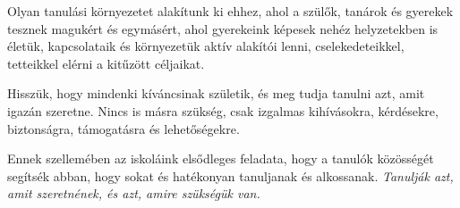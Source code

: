 Olyan tanulási környezetet alakítunk ki ehhez, ahol a szülők, tanárok és gyerekek tesznek magukért és egymásért, ahol gyerekeink képesek nehéz helyzetekben is életük, kapcsolataik és környezetük aktív alakítói lenni, cselekedeteikkel, tetteikkel elérni a kitűzött céljaikat.

Hisszük, hogy mindenki kíváncsinak születik, és meg tudja tanulni azt, amit igazán szeretne. Nincs is másra szükség, csak izgalmas kihívásokra, kérdésekre, biztonságra, támogatásra és lehetőségekre.

Ennek szellemében az iskoláink elsődleges feladata, hogy a tanulók közösségét segítsék abban, hogy sokat és hatékonyan tanuljanak és alkossanak. \emph{Tanulják azt, amit szeretnének, és azt, amire szükségük van.}
